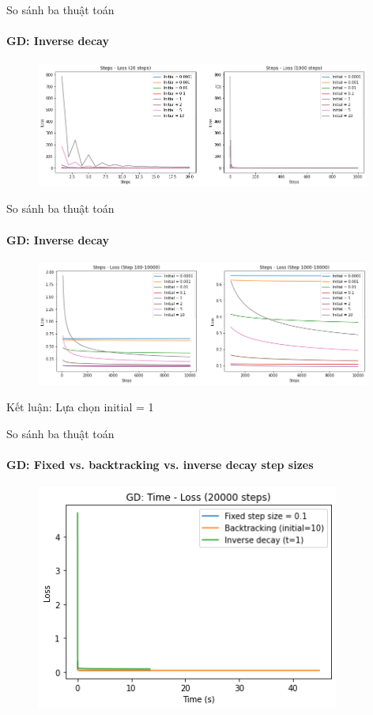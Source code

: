 \documentclass[10pt]{beamer}
\theoremstyle{remark}
\theoremstyle{definition}
\begin{document}
\begin{frame}{So sánh ba thuật toán}
	\framesubtitle{GD: Inverse decay}
	\begin{figure}[h!]
		\centering
		\includegraphics[width=11cm]{Thinh/7.png}
	\end{figure}
\end{frame}

\begin{frame}{So sánh ba thuật toán}
	\framesubtitle{GD: Inverse decay}

	\begin{figure}[h!]
		\centering
		\includegraphics[width=11cm]{Thinh/8.png}
	\end{figure}
	Kết luận: Lựa chọn initial = 1
\end{frame}

\begin{frame}{So sánh ba thuật toán}
	\framesubtitle{GD: Fixed vs. backtracking vs. inverse decay step sizes}
	\begin{figure}[h!]
		\centering
		\includegraphics[width=10cm]{Thinh/9.png}
	\end{figure}

\end{frame}
\end{document}
